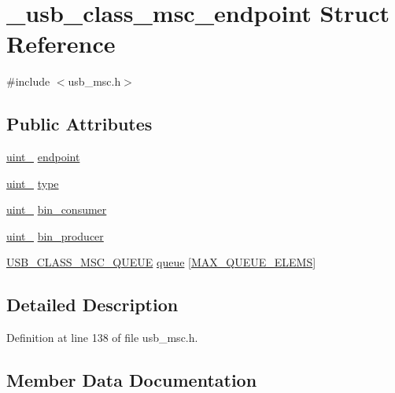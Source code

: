 \hypertarget{struct__usb__class__msc__endpoint}{}\section{\+\_\+usb\+\_\+class\+\_\+msc\+\_\+endpoint Struct Reference}
\label{struct__usb__class__msc__endpoint}


{\ttfamily \#include $<$usb\+\_\+msc.\+h$>$}

\subsection*{Public Attributes}
\begin{DoxyCompactItemize}
\item 
\hyperlink{types_8h_ad3209046c23f739a81581c10a4be7d92}{uint\+\_} \hyperlink{struct__usb__class__msc__endpoint_af13c97fb9746b6f147e6e4a69fb40687}{endpoint}
\item 
\hyperlink{types_8h_ad3209046c23f739a81581c10a4be7d92}{uint\+\_} \hyperlink{struct__usb__class__msc__endpoint_a9f97434fb32c7e4aa79a6a8eade31fed}{type}
\item 
\hyperlink{types_8h_ad3209046c23f739a81581c10a4be7d92}{uint\+\_} \hyperlink{struct__usb__class__msc__endpoint_ac6a3940a04987219c25919402695decd}{bin\+\_\+consumer}
\item 
\hyperlink{types_8h_ad3209046c23f739a81581c10a4be7d92}{uint\+\_} \hyperlink{struct__usb__class__msc__endpoint_a00832946458d7c10ffb9ab50902e2ad8}{bin\+\_\+producer}
\item 
\hyperlink{usb__msc_8h_a4a155e2ab08e1a306c818d6ba33d58c7}{U\+S\+B\+\_\+\+C\+L\+A\+S\+S\+\_\+\+M\+S\+C\+\_\+\+Q\+U\+E\+UE} \hyperlink{struct__usb__class__msc__endpoint_afbe87d35209635fc98c6c61dea49d9f0}{queue} \mbox{[}\hyperlink{usb__msc_8h_a85e8f631d131287d30fa675770f92c03}{M\+A\+X\+\_\+\+Q\+U\+E\+U\+E\+\_\+\+E\+L\+E\+MS}\mbox{]}
\end{DoxyCompactItemize}


\subsection{Detailed Description}


Definition at line 138 of file usb\+\_\+msc.\+h.



\subsection{Member Data Documentation}
